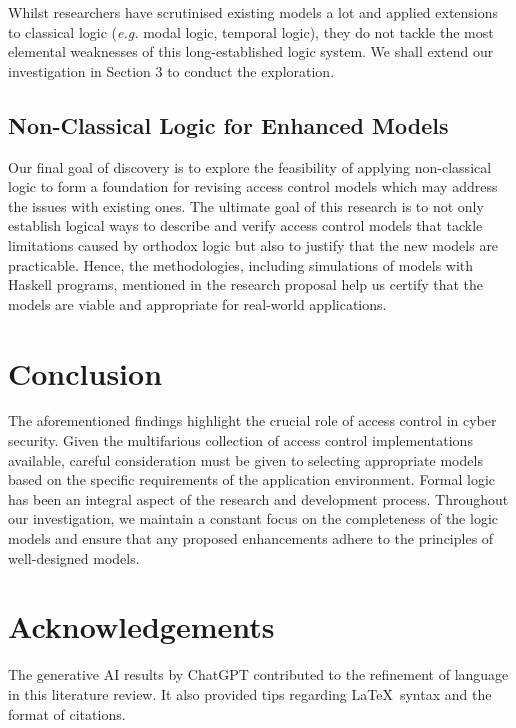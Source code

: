 \documentclass{article}
\begin{document}
Whilst researchers have scrutinised existing models a lot and applied
extensions to classical logic (\textit{e.g.} modal logic, temporal logic),
they do not tackle the most elemental weaknesses of this long-established
logic system. We shall extend our investigation in Section 3 to conduct
the exploration.

\subsection{Non-Classical Logic for Enhanced Models}

Our final goal of discovery is to explore the feasibility of applying
non-classical logic to form a foundation for revising access control models
which may address the issues with existing ones. The ultimate goal of this
research is to not only establish logical ways to describe and verify access
control models that tackle limitations caused by orthodox logic but also
to justify that the new models are practicable. Hence, the methodologies,
including simulations of models with Haskell programs, mentioned in the
research proposal help us certify that the models are viable and appropriate
for real-world applications.

\section{Conclusion}

The aforementioned findings highlight the crucial role of access control
in cyber security. Given the multifarious collection of access control
implementations available, careful consideration must be given to selecting
appropriate models based on the specific requirements of the application
environment. Formal logic has been an integral aspect of the research and
development process. Throughout our investigation, we maintain a constant
focus on the completeness of the logic models and ensure that any proposed
enhancements adhere to the principles of well-designed models.

\newpage

 

\section*{Acknowledgements}

The generative AI results by ChatGPT contributed to the refinement of
language in this literature review. It also provided tips regarding \LaTeX\
syntax and the format of citations.
\end{document}
